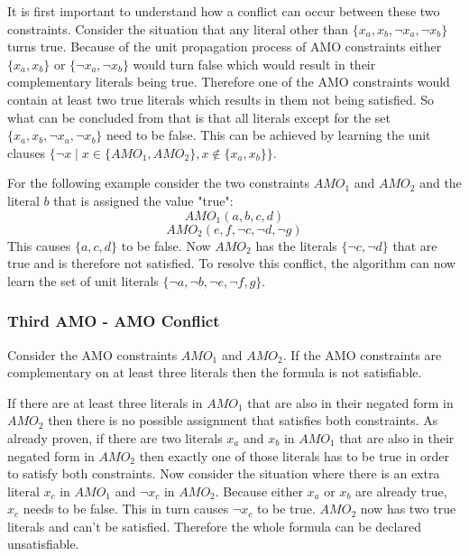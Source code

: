 It is first important to understand how a conflict can occur between these two constraints. Consider the situation that any literal other than $\{x_a, x_b, \neg x_a, \neg x_b\}$ turns true. Because of the unit propagation process of AMO constraints either $\{x_a, x_b\}$ or $\{\neg x_a, \neg x_b\}$ would turn false which would result in their complementary literals being true. Therefore one of the AMO constraints would contain at least two true literals which results in them not being satisfied. So what can be concluded from that is that all literals except for the set $\{x_a, x_b, \neg x_a, \neg x_b\}$ need to be false. This can be achieved by learning the unit clauses $\{\neg x \; | \; x \in \{AMO_1,AMO_2\}, x \notin \{x_a,x_b\}\}$.

For the following example consider the two constraints $AMO_1$ and $AMO_2$ and the literal $b$ that is assigned the value "true":
\begin{displaymath}
AMO_1(a,b,c,d)
\end{displaymath}
\begin{displaymath}
AMO_2(e,f,\neg c,\neg d, \neg g)
\end{displaymath}
This causes $\{a,c,d\}$ to be false. Now $AMO_2$ has the literals $\{\neg c,\neg d\}$ that are true and is therefore not satisfied. To resolve this conflict, the algorithm can now learn the set of unit literals $\{\neg a, \neg b, \neg e, \neg f, g\}$.

\subsubsection{Third AMO - AMO Conflict}

\begin{leftbar}
Consider the AMO constraints $AMO_1$ and $AMO_2$. If the AMO constraints are complementary on at least three literals then the formula is not satisfiable.
\end{leftbar}

If there are at least three literals in $AMO_1$ that are also in their negated form in $AMO_2$ then there is no possible assignment that satisfies both constraints. As already proven, if there are two literals $x_a$ and $x_b$ in $AMO_1$ that are also in their negated form in $AMO_2$ then exactly one of those literals has to be true in order to satisfy both constraints. Now consider the situation where there is an extra literal $x_c$ in $AMO_1$ and $\neg x_c$ in $AMO_2$. Because either $x_a$ or $x_b$ are already true, $x_c$ needs to be false. This in turn causes $\neg x_c$ to be true. $AMO_2$ now has two true literals and can't be satisfied. Therefore the whole formula can be declared unsatisfiable.

